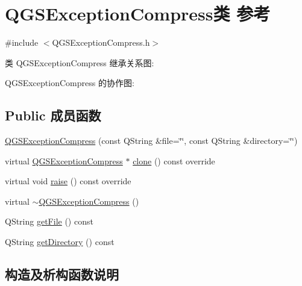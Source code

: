 \hypertarget{class_q_g_s_exception_compress}{}\section{Q\+G\+S\+Exception\+Compress类 参考}
\label{class_q_g_s_exception_compress}


{\ttfamily \#include $<$Q\+G\+S\+Exception\+Compress.\+h$>$}



类 Q\+G\+S\+Exception\+Compress 继承关系图\+:


Q\+G\+S\+Exception\+Compress 的协作图\+:
\subsection*{Public 成员函数}
\begin{DoxyCompactItemize}
\item 
\mbox{\hyperlink{class_q_g_s_exception_compress_a239d5b4de86e2802ddca614312d54d57}{Q\+G\+S\+Exception\+Compress}} (const Q\+String \&file=\char`\"{}\char`\"{}, const Q\+String \&directory=\char`\"{}\char`\"{})
\item 
virtual \mbox{\hyperlink{class_q_g_s_exception_compress}{Q\+G\+S\+Exception\+Compress}} $\ast$ \mbox{\hyperlink{class_q_g_s_exception_compress_a412b0b6d21a29dccc82b5672fe8f97d8}{clone}} () const override
\item 
virtual void \mbox{\hyperlink{class_q_g_s_exception_compress_a34cba6f06ac2a2f5ca80bb2732e6e33f}{raise}} () const override
\item 
virtual \mbox{\hyperlink{class_q_g_s_exception_compress_a0640ba6ffb83609e722f8180caa3e24e}{$\sim$\+Q\+G\+S\+Exception\+Compress}} ()
\item 
Q\+String \mbox{\hyperlink{class_q_g_s_exception_compress_a1a7483b8477fcf1b778cd06af8d8fcf0}{get\+File}} () const
\item 
Q\+String \mbox{\hyperlink{class_q_g_s_exception_compress_a7b7a33baa071f00069326d4326833c2e}{get\+Directory}} () const
\end{DoxyCompactItemize}


\subsection{构造及析构函数说明}
\mbox{\label{class_q_g_s_exception_compress_a239d5b4de86e2802ddca614312d54d57}} 
